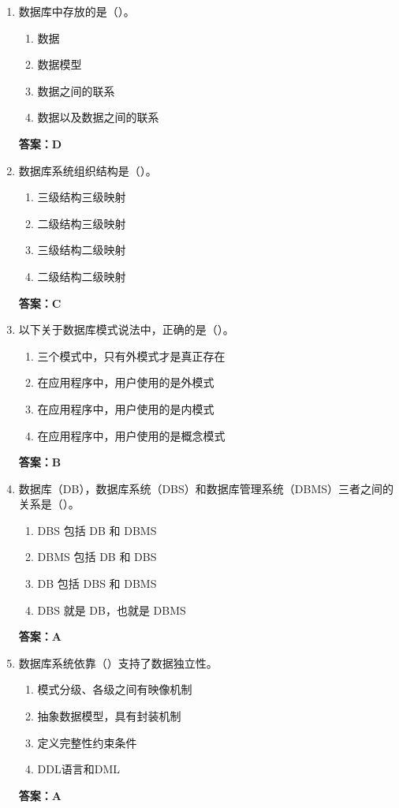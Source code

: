 \documentclass[12pt, a4paper]{article}
\begin{document}
\begin{enumerate}[label=\arabic*.]
	\item 数据库中存放的是（\quad）。
	      \begin{enumerate}
		      \item 数据
		      \item 数据模型
		      \item 数据之间的联系
		      \item 数据以及数据之间的联系
	      \end{enumerate}
	      \textbf{答案：D}

	\item 数据库系统组织结构是（\quad）。
	      \begin{enumerate}
		      \item 三级结构三级映射
		      \item 二级结构三级映射
		      \item 三级结构二级映射
		      \item 二级结构二级映射
	      \end{enumerate}
	      \textbf{答案：C}

	\item 以下关于数据库模式说法中，正确的是（\quad）。
	      \begin{enumerate}
		      \item 三个模式中，只有外模式才是真正存在
		      \item 在应用程序中，用户使用的是外模式
		      \item 在应用程序中，用户使用的是内模式
		      \item 在应用程序中，用户使用的是概念模式
	      \end{enumerate}
	      \textbf{答案：B}

	\item 数据库（DB），数据库系统（DBS）和数据库管理系统（DBMS）三者之间的关系是（\quad）。
	      \begin{enumerate}
		      \item DBS 包括 DB 和 DBMS
		      \item DBMS 包括 DB 和 DBS
		      \item DB 包括 DBS 和 DBMS
		      \item DBS 就是 DB，也就是 DBMS
	      \end{enumerate}
	      \textbf{答案：A}

	\item 数据库系统依靠（\quad）支持了数据独立性。
	      \begin{enumerate}
		      \item 模式分级、各级之间有映像机制
		      \item 抽象数据模型，具有封装机制
		      \item 定义完整性约束条件
		      \item DDL语言和DML
	      \end{enumerate}
	      \textbf{答案：A}


\end{enumerate}
\end{document}
